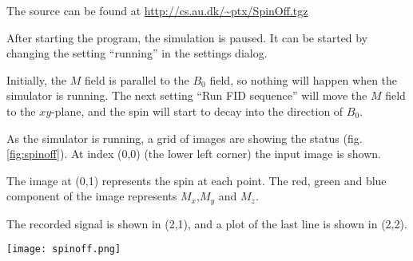 
The source can be found at \url{http://cs.au.dk/~ptx/SpinOff.tgz}

After starting the program, the simulation is paused. It can be
started by changing the setting ``running'' in the settings dialog.

Initially, the $M$ field is parallel to the $B_0$ field, so nothing
will happen when the simulator is running. The next setting ``Run FID
sequence'' will move the $M$ field to the $xy$-plane, and the spin
will start to decay into the direction of $B_0$.

As the simulator is running, a grid of images are showing the status
(fig. \ref{fig:spinoff}). At index (0,0) (the lower left corner) the
input image is shown.


The image at (0,1) represents the spin at each point. The red, green
and blue component of the image represents $M_x$,$M_y$ and $M_z$.

The recorded signal is shown in (2,1), and a plot of the last line is
shown in (2,2).

\begin{figure*}
  \texttt{[image: spinoff.png]}
  \caption{Simulator}
  \label{fig:spinoff}
\end{figure*}

